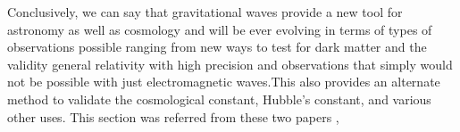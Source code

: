 \hspace{1cm}Conclusively, we can say that gravitational waves provide a new tool for astronomy as well as cosmology and will be ever evolving in terms of types of observations possible ranging from new ways to test for dark matter and the validity general relativity with high precision and observations that simply would not be possible with just electromagnetic waves.This also provides an alternate method to validate the cosmological constant, Hubble’s constant, and various other uses. This section was referred from these two papers \cite{Schutz_1999},\cite{Mukherjee_2020}

\pagebreak

